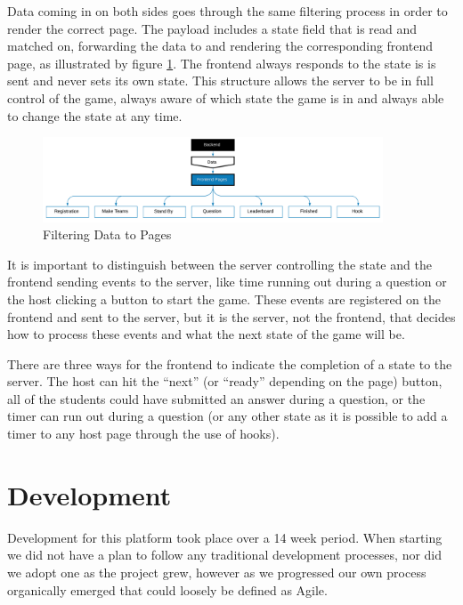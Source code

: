 \documentclass{article}
\begin{document}
            Data coming in on both sides goes through the same filtering process in order to render the correct page. The payload includes a state field that is read and matched on, forwarding the data to and rendering the corresponding frontend page, as illustrated by figure \ref{fig:frontend-pages}. The frontend always responds to the state is is sent and never sets its own state. This structure allows the server to be in full control of the game, always aware of which state the game is in and always able to change the state at any time.

            \begin{figure}[ht]
                \centering
                \includegraphics[width=0.9\textwidth]{images/frontend-pages.png}
                \caption{Filtering Data to Pages}
                \label{fig:frontend-pages}
            \end{figure}
            
            It is important to distinguish between the server controlling the state and the frontend sending events to the server, like time running out during a question or the host clicking a button to start the game. These events are registered on the frontend and sent to the server, but it is the server, not the frontend, that decides how to process these events and what the next state of the game will be.
            
            \smallskip
            There are three ways for the frontend to indicate the completion of a state to the server. The host can hit the ``next'' (or ``ready'' depending on the page) button, all of the students could have submitted an answer during a question, or the timer can run out during a question (or any other state as it is possible to add a timer to any host page through the use of hooks).

\section{Development}
    Development for this platform took place over a 14 week period. When starting we did not have a plan to follow any traditional development processes, nor did we adopt one as the project grew, however as we progressed our own process organically emerged that could loosely be defined as Agile.
    \smallskip
    
\end{document}
